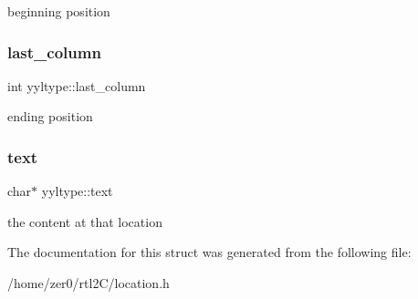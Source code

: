 beginning position \mbox{\label{structyyltype_a3908c6833d48b542a6553f5c804e48f7}} 
\subsubsection{\texorpdfstring{last\+\_\+column}{last\_column}}
{\footnotesize\ttfamily int yyltype\+::last\+\_\+column}

ending position \mbox{\label{structyyltype_aad0aa01bb6128302ad61d96adc661336}} 
\subsubsection{\texorpdfstring{text}{text}}
{\footnotesize\ttfamily char$\ast$ yyltype\+::text}

the content at that location 

The documentation for this struct was generated from the following file\+:\begin{DoxyCompactItemize}
\item 
/home/zer0/rtl2\+C/location.\+h\end{DoxyCompactItemize}
